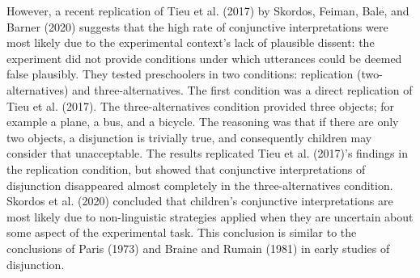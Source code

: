 \documentclass[
  english,
  ,man,floatsintext]{apa6}
\begin{document}
However, a recent replication of Tieu et al. (2017) by Skordos, Feiman, Bale, and Barner (2020) suggests that the high rate of conjunctive interpretations were most likely due to the experimental context's lack of plausible dissent: the experiment did not provide conditions under which utterances could be deemed false plausibly. They tested preschoolers in two conditions: replication (two-alternatives) and three-alternatives. The first condition was a direct replication of Tieu et al. (2017). The three-alternatives condition provided three objects; for example a plane, a bus, and a bicycle. The reasoning was that if there are only two objects, a disjunction is trivially true, and consequently children may consider that unacceptable. The results replicated Tieu et al. (2017)'s findings in the replication condition, but showed that conjunctive interpretations of disjunction disappeared almost completely in the three-alternatives condition. Skordos et al. (2020) concluded that children's conjunctive interpretations are most likely due to non-linguistic strategies applied when they are uncertain about some aspect of the experimental task. This conclusion is similar to the conclusions of Paris (1973) and Braine and Rumain (1981) in early studies of disjunction.
\end{document}

